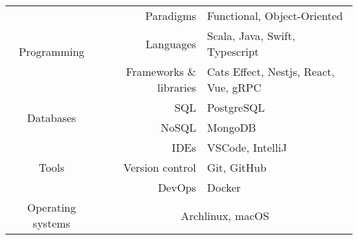 \documentclass[11pt]{spidercv}
\begin{document}
\thispagestyle{empty}




\pagebreak
{}

\begin{table}[h]
  \centering
  \begin{tabular}{crl}
    \toprule
    \multirow{3}{*}{Programming} & Paradigms                            & Functional, Object-Oriented           \\
    \cmidrule{2-3}
                                 & Languages                            & Scala, Java, Swift, Typescript        \\
    \cmidrule{2-3}
                                 & Frameworks \& libraries              & Cats Effect, Nestjs, React, Vue, gRPC \\
    \midrule
    \multirow{2}{*}{Databases}   & SQL                                  & PostgreSQL                            \\
    \cmidrule{2-3}
                                 & NoSQL                                & MongoDB                               \\
    \midrule
    \multirow{3}{*}{Tools}       & IDEs                                 & VSCode, IntelliJ                      \\
    \cmidrule{2-3}
                                 & Version control                      & Git, GitHub                           \\
    \cmidrule{2-3}
                                 & DevOps                               & Docker                                \\
    \midrule
    Operating systems            & \multicolumn{2}{c}{Archlinux, macOS}                                         \\
    \bottomrule
  \end{tabular}
\end{table}
\end{document}
